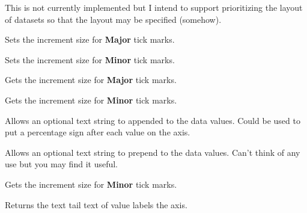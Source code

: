 \label{setdatasetorder}

This is not currently implemented but I intend to support prioritizing
the layout of datasets so that the layout may be specified (somehow). 

\label{setmajortickinc}


Sets the increment size for {\bf Major} tick marks.

\label{setminortickinc}


Sets the increment size for {\bf Minor} tick marks.

\label{getmajortickinc}


Gets the increment size for {\bf Major} tick marks.

\label{getminortickinc}


Gets the increment size for {\bf Minor} tick marks.

\label{settailtext}


Allows an optional text string to appended to the data values.
Could be used to put a percentage sign after each value on the axis.

\label{setheadtext}


Allows an optional text string to prepend to the data values.
Can't think of any use but you may find it useful.

Gets the increment size for {\bf Minor} tick marks.

\label{gettailtext}


Returns the text tail text of value labels the axis.

\label{getheadtext}


